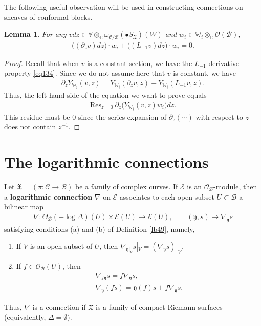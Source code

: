 \documentclass[12pt,b5paper,notitlepage]{report}
\theoremstyle{definition}
\theoremstyle{plain}
\newtheorem{lm}[df]{Lemma}
\newcommand{\fk}{\mathfrak}
\newcommand{\mc}{\mathcal}
\newcommand{\Res}{\mathrm{Res}}
\newcommand{\scr}{\mathscr}
\newcommand{\yk}{\mathfrak y}
\newcommand{\blt}{\bullet}
\newcommand{\Vbb}{\mathbb V}
\newcommand{\Wbb}{\mathbb W}
\newcommand{\Cbb}{\mathbb C}
\numberwithin{equation}{section}
\begin{document}
The following useful observation will be used in constructing connections on sheaves of conformal blocks.

\begin{lm}\label{lb55}
For any $vdz\in\Vbb\otimes_\Cbb\omega_{\mc C/\mc B}(\blt S_{\fk X})(W)$ and $w_i\in\Wbb_i\otimes_\Cbb\scr O(\mc B)$,
\begin{align*}
\big((\partial_zv)dz\big)\cdot w_i+\big((L_{-1}v)dz\big)\cdot w_i=0.
\end{align*}
\end{lm}

\begin{proof}
Recall that when $v$ is a constant section, we have the $L_{-1}$-derivative property \eqref{eq134}. Since we do not assume here that $v$ is constant, we have
\begin{align*}
\partial_z Y_{\Wbb_i}(v,z)=Y_{\Wbb_i}(\partial_zv,z)+Y_{\Wbb_i}(L_{-1}v,z).
\end{align*}
Thus, the left hand side of the equation we want to prove equals
\begin{align*}
\Res_{z=0}~\partial_z\big(Y_{\Wbb_i}(v,z)w_i\big)dz.
\end{align*}
This residue must be $0$ since the series expansion of $\partial_z(\cdots)$ with respect to $z$ does not contain $z^{-1}$.
\end{proof}






\section{The logarithmic connections}\label{lb84}


Let $\fk X=(\pi:\mc C\rightarrow\mc B)$ be a family of complex curves. If $\scr E$ is an $\scr O_{\mc B}$-module, then a \textbf{logarithmic connection} $\nabla$ on $\scr E$ associates to each open subset $U\subset \mc B$ a bilinear map
\begin{gather*}
\nabla:\Theta_{\mc B}(-\log\Delta)(U)\times\scr E(U)\rightarrow\scr E(U),\qquad (\yk,s)\mapsto \nabla_{\yk} s
\end{gather*}
satisfying conditions (a) and (b) of Definition \ref{lb49}, namely,
\begin{enumerate}[label=(\alph*)]
\item If $V$ is an open subset of $U$, then $\nabla_{\yk|_V}s|_V=(\nabla_{\yk} s)|_V$.
\item If $f\in\scr O_{\mc B}(U)$, then
\begin{gather*}
\nabla_{f\yk}s=f\nabla_{\yk}s,\\
\nabla_{\yk}(fs)=\yk(f)s+f\nabla_{\yk}s.
\end{gather*}
\end{enumerate}
Thus, $\nabla$ is a connection if $\fk X$ is a family of compact Riemann surfaces (equivalently, $\Delta=\emptyset$).
\end{document}
